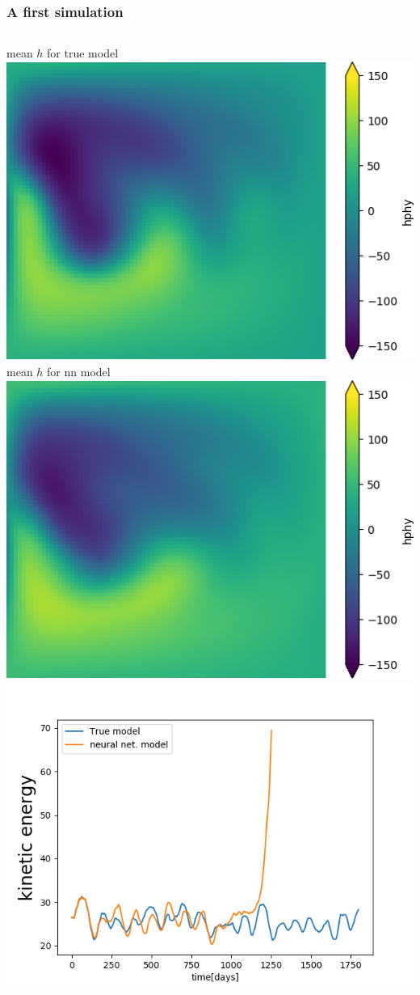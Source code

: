 \documentclass[handout]{beamer}
\begin{document}
\begin{frame}
\frametitle{A first simulation}
\begin{columns}
\centering
{\footnotesize mean $h$ for true model}\\
\includegraphics[width=\textwidth]{./fig/L3/meannw-hphy0.png}
\centering
{\footnotesize mean $h$ for nn model}\\
\includegraphics[width=\textwidth]{./fig/L3/meannw-hphy1.png}
\includegraphics[width=\textwidth]{./fig/L3/evolnw-EC.png}\\

\end{columns}
\end{frame}
\end{document}
